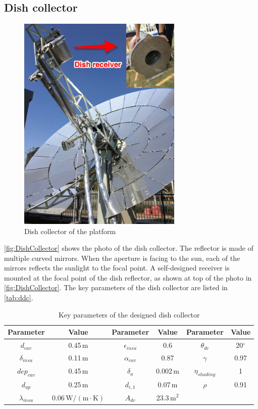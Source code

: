 \subsection{Dish collector}

\begin{figure}[!ht]
\centering
\includegraphics[width=0.7\textwidth]{fig/DishCollector.jpg}
\caption{Dish collector of the platform}\label{fig:DishCollector}
\end{figure}
\autoref{fig:DishCollector} shows the photo of the dish collector. The reflector is made of multiple curved mirrors. When the aperture is facing to the sun, each of the mirrors reflects the sunlight to the focal point. 
A self-designed receiver is mounted at the focal point of the dish reflector, as shown at top of the photo in \autoref{fig:DishCollector}.
The key parameters of the dish collector are listed in \autoref{tab:ddc}. 
\begin{table}[htbp]
	\caption{Key parameters of the designed dish collector}
	\centering
	\begin{tabular}{cccccc}
		\toprule
		Parameter		&	Value	&	Parameter		&	Value	&	Parameter		&	Value\\
		\midrule
		$d_{cav}$	&	0.45$\,\mathrm{m}$	&	$\epsilon_{insu}$	&	0.6	&	$\theta_{dc}$	&	20$^\circ$\\
		$\delta_{insu}$	&	0.11$\,\mathrm{m}$	&	$\alpha_{cav}$	&	0.87	&	$\gamma$	&	0.97\\
		$dep_{cav}$	&	0.45$\,\mathrm{m}$	&	$\delta_a$		&	0.002$\,\mathrm{m}$	&	$\eta_{shading}$	&	1\\
		$d_{ap}$	&	0.25$\,\mathrm{m}$	&	$d_{i,1}$	&	0.07$\,\mathrm{m}$	&	$\rho$	&	0.91\\
		$\lambda_{insu}$	&	0.06$\,\mathrm{W/(m\cdot K)}$	&	$A_{dc}$	&	23.3$\,\mathrm{m^2}$	&	\\		
		\bottomrule
	\end{tabular}
	
	\label{tab:ddc}
\end{table}

